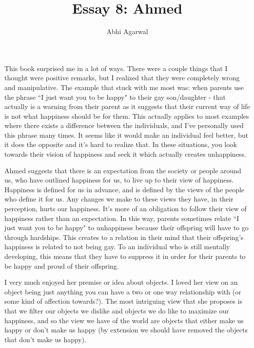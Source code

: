 \documentclass[11pt, oneside]{article}
\title{Essay 8: Ahmed}
\author{Abhi Agarwal}
\date{}
\begin{document}
\maketitle

\par This book surprised me in a lot of ways. There were a couple things that I thought were positive remarks, but I realized that they were completely wrong and manipulative. The example that stuck with me most was: when parents use the phrase ``I just want you to be happy" to their gay son/daughter - that actually is a warning from their parent as it suggests that their current way of life is not what happiness should be for them. This actually applies to most examples where there exists a difference between the individuals, and I've personally used this phrase many times. It seems like it would make an individual feel better, but it does the opposite and it's hard to realize that. In these situations, you look towards their vision of happiness and seek it which actually creates unhappiness. 

\par Ahmed suggests that there is an expectation from the society or people around us, who have outlined happiness for us, to live up to their view of happiness. Happiness is defined for us in advance, and is defined by the views of the people who define it for us. Any changes we make to these views they have, in their perception, hurts our happiness. It's more of an obligation to follow their view of happiness rather than an expectation. In this way, parents sometimes relate ``I just want you to be happy" to unhappiness because their offspring will have to go through hardships. This creates to a relation in their mind that their offspring's happiness is related to not being gay. To an individual who is still mentally developing, this means that they have to suppress it in order for their parents to be happy and proud of their offspring.

\par I very much enjoyed her premise or idea about objects. I loved her view on an object being just anything you can have a two or one way relationship with (or some kind of affection towards?). The most intriguing view that she proposes is that we filter our objects we dislike and objects we do like to maximize our happiness, and so the view we have of the world are objects that either make us happy or don't make us happy (by extension we should have removed the objects that don't make us happy). 
\end{document}

